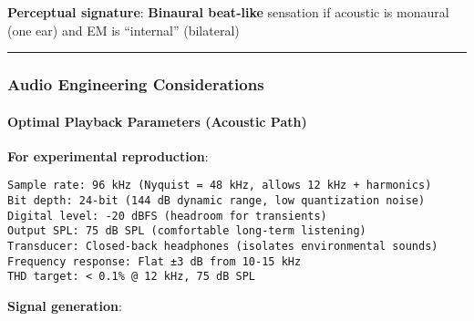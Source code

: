 \textbf{Perceptual signature}: \textbf{Binaural beat-like} sensation if
acoustic is monaural (one ear) and EM is ``internal'' (bilateral)

\begin{center}\rule{0.5\linewidth}{0.5pt}\end{center}

\subsubsection{Audio Engineering
Considerations}\label{audio-engineering-considerations}

\paragraph{Optimal Playback Parameters (Acoustic
Path)}\label{optimal-playback-parameters-acoustic-path}

\textbf{For experimental reproduction}:

\begin{verbatim}
Sample rate: 96 kHz (Nyquist = 48 kHz, allows 12 kHz + harmonics)
Bit depth: 24-bit (144 dB dynamic range, low quantization noise)
Digital level: -20 dBFS (headroom for transients)
Output SPL: 75 dB SPL (comfortable long-term listening)
Transducer: Closed-back headphones (isolates environmental sounds)
Frequency response: Flat ±3 dB from 10-15 kHz
THD target: < 0.1% @ 12 kHz, 75 dB SPL
\end{verbatim}

\textbf{Signal generation}:

\begin{Shaded}
\begin{Highlighting}[]

\OperatorTok{=}   
\OperatorTok{=}   
\OperatorTok{=}   
\OperatorTok{=} \OperatorTok{**}\NormalTok{(}\OperatorTok{{-}}\OperatorTok{/}\NormalTok{)  }

\OperatorTok{=}\OperatorTok{/}

\OperatorTok{=}\OperatorTok{*} \OperatorTok{*}\OperatorTok{*}\OperatorTok{*}


\end{Highlighting}
\end{Shaded}

